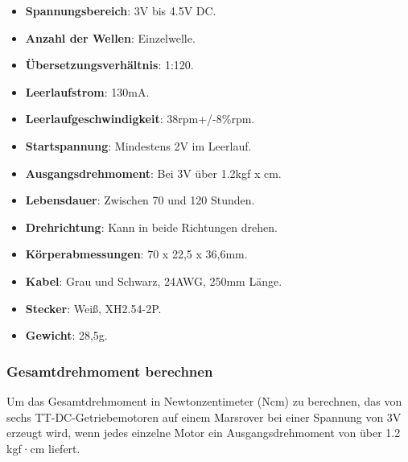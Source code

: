\documentclass{vorlage-design-main}
\begin{document}
\begin{itemize}

\item
  \textbf{Spannungsbereich}: 3V bis 4.5V DC.
\item
  \textbf{Anzahl der Wellen}: Einzelwelle.
\item
  \textbf{Übersetzungsverhältnis}: 1:120.
\item
  \textbf{Leerlaufstrom}: 130mA.
\item
  \textbf{Leerlaufgeschwindigkeit}: 38rpm+/-8\%rpm.
\item
  \textbf{Startspannung}: Mindestens 2V im Leerlauf.
\item
  \textbf{Ausgangsdrehmoment}: Bei 3V über 1.2kgf x cm.
\item
  \textbf{Lebensdauer}: Zwischen 70 und 120 Stunden.
\item
  \textbf{Drehrichtung}: Kann in beide Richtungen drehen.
\item
  \textbf{Körperabmessungen}: 70 x 22,5 x 36,6mm.
\item
  \textbf{Kabel}: Grau und Schwarz, 24AWG, 250mm Länge.
\item
  \textbf{Stecker}: Weiß, XH2.54-2P.
\item
  \textbf{Gewicht}: 28,5g.
\end{itemize}

\hypertarget{gesamtdrehmoment-berechnen}{%
\subsubsection{Gesamtdrehmoment
berechnen}\label{gesamtdrehmoment-berechnen}}

Um das Gesamtdrehmoment in Newtonzentimeter (Ncm) zu berechnen, das von
sechs TT-DC-Getriebemotoren auf einem Marsrover bei einer Spannung von
3V erzeugt wird, wenn jedes einzelne Motor ein Ausgangsdrehmoment von
über 1.2 kgf·cm liefert.
\end{document}
